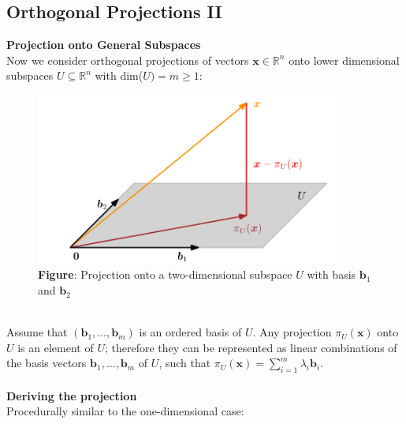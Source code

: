 \documentclass{report}
\begin{document}
\subsection{Orthogonal Projections II}%
\textbf{Projection onto General Subspaces}\\
Now we consider orthogonal projections of vectors $\bm{x}
\in\mathbb{R}^n$ onto lower dimensional subspaces $U\subseteq\mathbb{R}^n$ with dim($U)=m\geq1$:
\begin{figure}[h]
\includegraphics[width=10cm]{9}\\
\centering
\textbf{Figure}: Projection onto a two-dimensional subspace $U$ with basis $\bm{b}_1$ and $\bm{b}_2$
\end{figure}\\
Assume that $(\bm{b}_1,\ldots,\bm{b}_m)$ is an ordered basis of $U$. Any projection $\pi_U(\bm{x})$ onto $U$ is 
an element of $U$; therefore they can be represented
as linear combinations of the basis vectors $\bm{b}_1,\ldots,\bm{b}_m$ of $U$, such that
$\pi_U(\bm{x})=\sum^m_{i=1}\lambda_i\bm{b}_i$.\\
\vspace{1mm}\\
\textbf{Deriving the projection}\\
Procedurally similar to the one-dimensional case:
\end{document}
